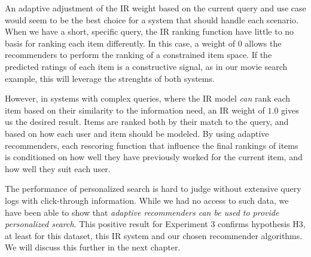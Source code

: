 An adaptive adjustment of the IR weight based on the current query and use case
would seem to be the best choice for a system that should handle each scenario.
When we have a short, specific query, the IR ranking function have little to
no basis for ranking each item differently.
In this case, a weight of $0$ allows the recommenders to perform the ranking
of a constrained item space.
If the predicted ratings of each item is a constructive signal,
as in our movie search example, this will leverage the strenghts of both systems.

However, in systems with complex queries, where the IR model
\emph{can} rank each item based on their similarity to the information need,
an IR weight of $1.0$ gives us the desired result.
Items are ranked both by their match to the query,
and based on how each user and item should be modeled.
By using adaptive recommenders, each rescoring function
that influence the final rankings of items is conditioned
on how well they have previously worked for the current item,
and how well they suit each user.

The performance of personalized search is hard to judge without
extensive query logs with click-through information.
While we had no access to such data, 
we have been able to show that \emph{adaptive recommenders
can be used to provide personalized search}.
This positive result for Experiment 3 confirms hypothesis H3,
at least for this dataset, this IR system and our chosen recommender algorithms.
We will discuss this further in the next chapter.


